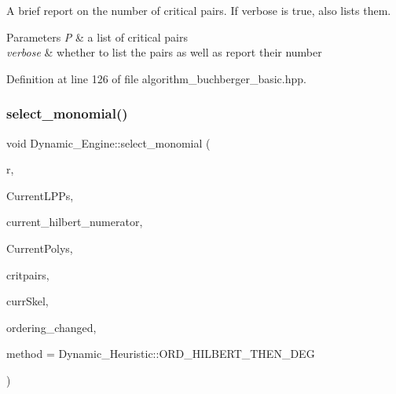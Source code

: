 A brief report on the number of critical pairs. If {\ttfamily verbose} is true, also lists them. 


\begin{DoxyParams}{Parameters}
{\em P} & a list of critical pairs \\
\hline
{\em verbose} & whether to list the pairs as well as report their number \\
\hline
\end{DoxyParams}


Definition at line 126 of file algorithm\+\_\+buchberger\+\_\+basic.\+hpp.

\mbox{\label{group___g_b_computation_gaa01d88c431b84deabf51ee116d7d2a0e}} 
\subsubsection{\texorpdfstring{select\+\_\+monomial()}{select\_monomial()}\hspace{0.1cm}{\footnotesize\ttfamily [1/2]}}
{\footnotesize\ttfamily void Dynamic\+\_\+\+Engine\+::select\+\_\+monomial (\begin{DoxyParamCaption}\item[{\hyperlink{group__polygroup_class_abstract___polynomial}{Abstract\+\_\+\+Polynomial} $\ast$}]{r,  }\item[{list$<$ \hyperlink{group__polygroup_class_monomial}{Monomial} $>$ \&}]{Current\+L\+P\+Ps,  }\item[{\hyperlink{group__polygroup_class_dense___univariate___integer___polynomial}{Dense\+\_\+\+Univariate\+\_\+\+Integer\+\_\+\+Polynomial} $\ast$$\ast$}]{current\+\_\+hilbert\+\_\+numerator,  }\item[{const list$<$ \hyperlink{group__polygroup_class_abstract___polynomial}{Abstract\+\_\+\+Polynomial} $\ast$ $>$ \&}]{Current\+Polys,  }\item[{const list$<$ \hyperlink{group___g_b_computation_class_critical___pair___dynamic}{Critical\+\_\+\+Pair\+\_\+\+Dynamic} $\ast$ $>$ \&}]{critpairs,  }\item[{\hyperlink{group___c_l_s_solvers_class_l_p___solvers_1_1_l_p___solver}{L\+P\+\_\+\+Solver} $\ast$}]{curr\+Skel,  }\item[{bool \&}]{ordering\+\_\+changed,  }\item[{\hyperlink{group___g_b_computation_ga819b1fd40d9a40ff303df3b90647ecb0}{Dynamic\+\_\+\+Heuristic}}]{method = {\ttfamily Dynamic\+\_\+Heuristic\+:\+:ORD\+\_\+HILBERT\+\_\+THEN\+\_\+DEG} }\end{DoxyParamCaption})}



